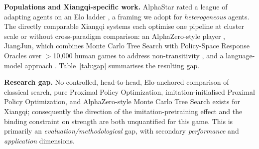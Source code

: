 \documentclass[conference]{IEEEtran}
\begin{document}
\textbf{Populations and Xiangqi-specific work.} AlphaStar rated a league of
adapting agents on an Elo ladder \cite{vinyals2019}, a framing we adopt for
\emph{heterogeneous} agents. The directly comparable Xiangqi systems each optimise
one pipeline at cluster scale or without cross-paradigm comparison: an
AlphaZero-style player \cite{yilmaz2025}, JiangJun, which combines Monte Carlo Tree
Search with Policy-Space Response Oracles over $>$10{,}000 human games to address
non-transitivity \cite{li2023jiangjun}, and a language-model approach
\cite{xiangqir1}. Table~\ref{tab:gap} summarises the resulting gap.

\begin{table}[t]
\caption{Where prior work leaves the gap this study fills.}
\label{tab:gap}
\centering
\footnotesize
{}
\end{table}

\textbf{Research gap.} No controlled, head-to-head, Elo-anchored comparison of
classical search, pure Proximal Policy Optimization, imitation-initialised
Proximal Policy Optimization, and AlphaZero-style Monte Carlo Tree Search exists
for Xiangqi; consequently the direction of the
imitation-pretraining effect and the binding constraint on strength are both
unquantified for this game. This is primarily an
\emph{evaluation/methodological} gap, with secondary \emph{performance} and
\emph{application} dimensions.
\end{document}
